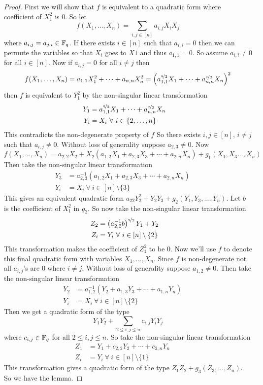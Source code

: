 \begin{proof}
  First we will show that $f$ is equivalent to a quadratic form where coefficient of $X_1^2$ is $0$. So let $$f(X_1,\dots, X_n)=\sum_{i,j\in[n]}a_{i,j}X_iX_j$$ where $a_{i,j}=a_{j,i}\in\mathbb{F}_q$. If there exists $i\in[n]$ such that $a_{i,i}=0$ then we can permute the variables so that $X_i$ goes to $X1$ and thus $a_{1,1}=0$. So assume $a_{i,i}\neq 0$ for all $i\in[n]$. Now if $a_{i,j}=0$ for all $i\neq j$ then $$f(X_1,\dots, X_n)=a_{1,1}X_1^2+\cdots +a_{n,n}X_n^2=\left(a_{1,1}^{\nicefrac{q}2}X_1+\cdots +a_{n,n}^{\nicefrac{q}2}X_n\right)^2$$then $f$ is equivalent to $Y_1^2$ by the non-singular linear transformation\begin{align*}
    Y_1&=a_{1,1}^{\nicefrac{q}2}X_1+\cdots +a_{n,n}^{\nicefrac{q}2}X_n&&\\
    Y_i&=X_i\ \forall\ i\in\{2,\dots, n\}&&
  \end{align*}This contradicts the non-degenerate property of $f$ \ctr So there exists $i,j\in[n]$, $i\neq j$ such that $a_{i,j}\neq 0$. Without loss of generality suppose $a_{2,3}\neq 0$. Now $$f(X_1,\dots, X_n)=a_{2,2}X_2+X_2(a_{1,2}X_1+a_{2,3}X_3+\cdots +a_{2,n}X_n)+g_1(X_1,X_3\dots, X_n)$$Then take the non-singular linear transformation
  \begin{align*}
    Y_3&=a_{2,3}^{-1}(a_{1,2}X_1+a_{2,3}X_3+\cdots +a_{2,n}X_n)&&\\
    Y_i&=X_i\ \forall\ i\in[n]\setminus\{3\}&&
  \end{align*}This gives an equivalent quadratic form $a_{22}Y_2^2+Y_2Y_3+g_2(Y_1,Y_3,\dots, Y_n)$. Let $b$ is the coefficient of $X_1^2$ in $g_2$. So now take the non-singular linear transformation
  \begin{align*}
    Z_2&=\left(a_{2,2}^{-1}b\right)^{\nicefrac{q}2}Y_1+Y_2&&\\
    Z_i&=Y_i\ \forall\ i\in[n]\setminus\{2\}&&
  \end{align*}This transformation makes the coefficient of $Z_1^2$ to be $0$. Now we'll use $f$ to denote this final quadratic form with variables $X_1,\dots, X_n$. Since $f$ is non-degenerate not all $a_{i,j}$'s are $0$ where $i\neq j$. Without loss of generality suppose $a_{1,2}\neq 0$. Then take the non-singular linear transformation
    \begin{align*}
    Y_2&=a_{1,2}^{-1}(Y_2+a_{1,3}Y_3+\cdots +a_{1,n}Y_n)&&\\
    Y_i&=X_i\ \forall\ i\in[n]\setminus\{2\}&&
  \end{align*}Then we get a quadratic form of the type $$Y_1Y_2+\sum_{2\leq i,j\leq n}c_{i,j}Y_iY_j$$ where $c_{i,j}\in\mathbb{F}_q$ for all $2\leq i,j\leq n$. So take the non-singular linear transformation   \begin{align*}
    Z_1& = Y_1+c_{2,2}Y_2+\cdots +c_{2,n}Y_n&&\\
    Z_i&=Y_i\ \forall\ i\in[n]\setminus\{1\}&&
  \end{align*}
  This transformation gives a quadratic form of the type $Z_1Z_2+g_3(Z_3,\dots, Z_n)$. So we have the lemma. 
\end{proof}

